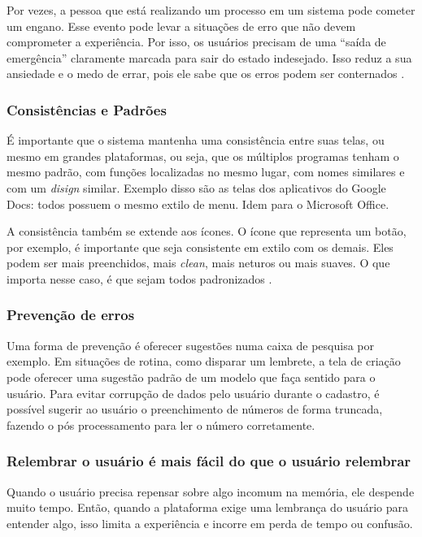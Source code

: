 Por vezes, a pessoa que está realizando um processo em um sistema pode cometer um engano. Esse evento pode levar a situações de erro que não devem comprometer a experiência. Por isso, os usuários precisam de uma “saída de emergência” claramente marcada para sair do estado indesejado. Isso reduz a sua ansiedade e o medo de errar, pois ele sabe que os erros podem ser conternados \cite{BarbosaEtAl2021InteracaoHumanoComputadorExperiencia}.

\subsubsection{Consistências e Padrões}

É importante que o sistema mantenha uma consistência entre suas telas, ou mesmo em grandes plataformas, ou seja, que os múltiplos programas tenham o mesmo padrão, com funções localizadas no mesmo lugar, com nomes similares e com um \textit{disign} similar. Exemplo disso são as telas dos aplicativos do Google Docs: todos possuem o mesmo extilo de menu. Idem para o Microsoft Office.

A consistência também se extende aos ícones. O ícone que representa um botão, por exemplo, é importante que seja consistente em extilo com os demais. Eles podem ser mais preenchidos, mais \textit{clean}, mais neturos ou mais suaves. O que importa nesse caso, é que sejam todos padronizados \cite{site:nielsenIcon}.


\subsubsection{Prevenção de erros}

Uma forma de prevenção é oferecer sugestões numa caixa de pesquisa por exemplo. Em situações de rotina, como disparar um lembrete, a tela de criação pode oferecer uma sugestão padrão de um modelo que faça sentido para o usuário. Para evitar corrupção de dados pelo usuário durante o cadastro, é possível sugerir ao usuário o preenchimento de números de forma truncada, fazendo o pós processamento para ler o número corretamente.

\subsubsection{Relembrar o usuário é mais fácil do que o usuário relembrar}

Quando o usuário precisa repensar sobre algo incomum na memória, ele despende muito tempo. Então, quando a plataforma exige uma lembrança do usuário para entender algo, isso limita a experiência e incorre em perda de tempo ou confusão.

